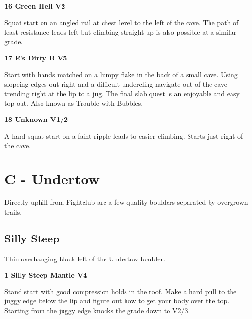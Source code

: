 \begin{multicols}{2}
			\label{rt:Green Hell}
\colorbox{green!20}{
\parbox{0.95\linewidth}{
\textbf{
16 Green Hell V2  
}
}
}

			\begin{adjustwidth}{0.5cm}{}				
			Squat start on an angled rail at chest level to the left of the cave. The path of least resistance leads left but climbing straight up is also possible at a similar grade.
			\end{adjustwidth}
			\label{rt:E's Dirty B}
\colorbox{RoyalBlue!20}{
\parbox{0.95\linewidth}{
\textbf{
17 E's Dirty B V5  
}
}
}

			\begin{adjustwidth}{0.5cm}{}				
			Start with hands matched on a lumpy flake in the back of a small cave. Using slopeing edges out right and a difficult undercling navigate out of the cave trending right at the lip to a jug. The final slab quest is an enjoyable and easy top out. Also known as Trouble with Bubbles.
			\end{adjustwidth}
			\label{rt:Unknown}
\colorbox{green!20}{
\parbox{0.95\linewidth}{
\textbf{
18 Unknown V1/2  
}
}
}

			\begin{adjustwidth}{0.5cm}{}				
			A hard squat start on a faint ripple leads to easier climbing. Starts just right of the cave.
			\end{adjustwidth}
\newpage

		\section{C - Undertow}\label{sa:Undertow}
	Directly uphill from Fightclub are a few quality boulders separated by overgrown trails.\\

	
		\subsection*{Silly Steep}\label{bf:Silly Steep}
		Thin overhanging block left of the Undertow boulder.\\
	
			\label{rt:Silly Steep Mantle}
\colorbox{RoyalBlue!20}{
\parbox{0.95\linewidth}{
\textbf{
1 Silly Steep Mantle V4  
}
}
}

			\begin{adjustwidth}{0.5cm}{}				
			Stand start with good compression holds in the roof. Make a hard pull to the juggy edge below the lip and figure out how to get your body over the top. Starting from the juggy edge knocks the grade down to V2/3.
			\end{adjustwidth}


\end{multicols}
